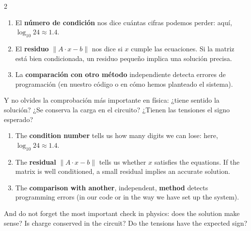 \begin{paracol}{2}
\begin{enumerate}
\item El \textbf{número de condición} nos dice cuántas cifras podemos perder: aquí, $\log_{10}24\approx 1.4$.
\item El \textbf{residuo} $\lVert A\cdot x-b\rVert$ nos dice si $x$ cumple las ecuaciones. Si la matriz está bien condicionada, un residuo pequeño implica una solución precisa.
\item La \textbf{comparación con otro método} independiente detecta errores de programación (en nuestro código o en cómo hemos planteado el sistema).
\end{enumerate}
Y no olvides la comprobación más importante en física: ¿tiene sentido la solución? ¿Se conserva la carga en el circuito? ¿Tienen las tensiones el signo esperado?

\switchcolumn
\begin{enumerate}
\item The \textbf{condition number} tells us how many digits we can lose: here, $\log_{10}24\approx 1.4$.
\item The \textbf{residual} $\lVert A\cdot x-b\rVert$ tells us whether $x$ satisfies the equations. If the matrix is well conditioned, a small residual implies an accurate solution.
\item The \textbf{comparison with another}, independent, \textbf{method} detects programming errors (in our code or in the way we have set up the system).
\end{enumerate}
And do not forget the most important check in physics: does the solution make sense? Is charge conserved in the circuit? Do the tensions have the expected sign?
\end{paracol}


